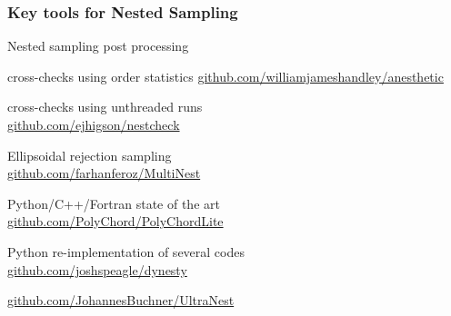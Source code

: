 \documentclass[aspectratio=169]{beamer}
\begin{document}
\begin{frame}
    \frametitle{Key tools for Nested Sampling}
    \begin{description}
        \item[\texttt{anesthetic}] Nested sampling post processing \\
        \item[\texttt{insertion}] cross-checks using order statistics 
            \hspace{5pt}\url{github.com/williamjameshandley/anesthetic}
        \item[\texttt{nestcheck}] cross-checks using unthreaded runs \\
            \hspace{5pt}\url{github.com/ejhigson/nestcheck}
        \item[\texttt{MultiNest}] Ellipsoidal rejection sampling \\
            \hspace{5pt}\url{github.com/farhanferoz/MultiNest}
        \item[\texttt{PolyChord}] Python/C++/Fortran state of the art \\
            \hspace{5pt}\url{github.com/PolyChord/PolyChordLite} 
        \item[\texttt{dynesty}] Python re-implementation of several codes \\
            \hspace{5pt}\url{github.com/joshspeagle/dynesty}
        \item[\& \texttt{UltraNest}] \hspace{5pt}\url{github.com/JohannesBuchner/UltraNest}
    \end{description}
\end{frame}
\end{document}
